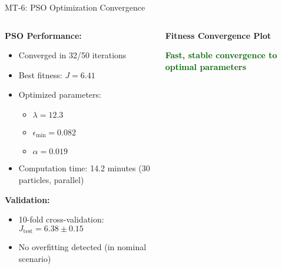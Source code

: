 \documentclass[10pt,aspectratio=169]{beamer}
\newcommand{\emphgreen}[1]{\textcolor{darkgreen}{\textbf{#1}}}
\begin{document}
\begin{frame}{MT-6: PSO Optimization Convergence}
\begin{columns}
\begin{column}{0.5\textwidth}
\textbf{PSO Performance:}
\begin{itemize}
    \item Converged in 32/50 iterations
    \item Best fitness: $J = 6.41$
    \item Optimized parameters:
    \begin{itemize}
        \item $\lambda = 12.3$
        \item $\epsilon_{\min} = 0.082$
        \item $\alpha = 0.019$
    \end{itemize}
    \item Computation time: 14.2 minutes (30 particles, parallel)
\end{itemize}

\vspace{0.3cm}
\textbf{Validation:}
\begin{itemize}
    \item 10-fold cross-validation: $J_{\text{test}} = 6.38 \pm 0.15$
    \item No overfitting detected (in nominal scenario)
\end{itemize}
\end{column}
\begin{column}{0.5\textwidth}
\begin{center}
\textbf{Fitness Convergence Plot}
\end{center}

\vspace{0.2cm}
\centering
\emphgreen{Fast, stable convergence to optimal parameters}
\end{column}
\end{columns}
\end{frame}
\end{document}
